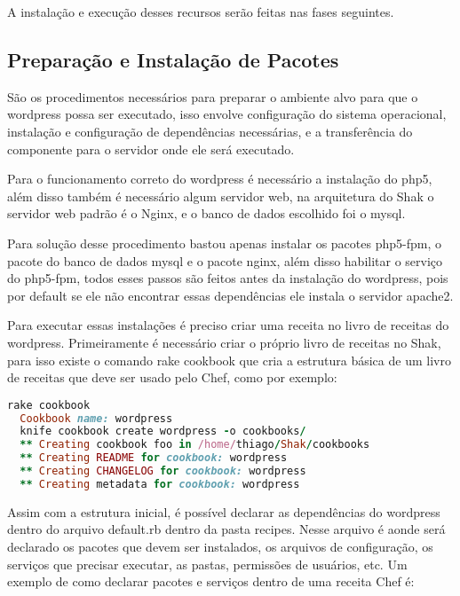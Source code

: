 A instalação e execução desses recursos serão feitas nas fases seguintes.

\subsection{Preparação e Instalação de Pacotes}
\label{wordpress:preparacao}

São os procedimentos necessários para preparar o ambiente alvo para que o wordpress
possa ser executado, isso envolve configuração do sistema operacional, instalação
e configuração de dependências necessárias, e a transferência do componente
para o servidor onde ele será executado.

Para o funcionamento correto do wordpress é necessário a instalação do php5, além
disso também é necessário algum servidor web, na arquitetura do Shak o servidor
web padrão é o Nginx, e o banco de dados escolhido foi o mysql.

Para solução desse procedimento bastou apenas instalar os pacotes php5-fpm, o pacote
do banco de dados mysql e o pacote nginx, além disso habilitar o serviço do
php5-fpm, todos esses passos são feitos antes da instalação do wordpress,
pois por default se ele não encontrar essas dependências ele instala o servidor
apache2.

Para executar essas instalações é preciso criar uma receita no livro de receitas
do wordpress. Primeiramente é necessário criar o próprio livro de receitas no Shak,
para isso existe o comando rake cookbook que cria a estrutura básica
de um livro de receitas que deve ser usado pelo Chef, como por exemplo:

\begin{lstlisting}[language=Ruby,label=dice_index,caption={Exemplo de criação de estrutura básica de livro de receitas do wordpress com shak}]
  rake cookbook
  Cookbook name: wordpress
  knife cookbook create wordpress -o cookbooks/
  ** Creating cookbook foo in /home/thiago/Shak/cookbooks
  ** Creating README for cookbook: wordpress
  ** Creating CHANGELOG for cookbook: wordpress
  ** Creating metadata for cookbook: wordpress
\end{lstlisting}

Assim com a estrutura inicial, é possível declarar as dependências do wordpress
dentro do arquivo default.rb dentro da pasta recipes. Nesse arquivo é aonde
será declarado os pacotes que devem ser instalados, os arquivos de configuração,
os serviços que precisar executar, as pastas, permissões de usuários, etc. Um exemplo
de como declarar pacotes e serviços dentro de uma receita Chef é:

